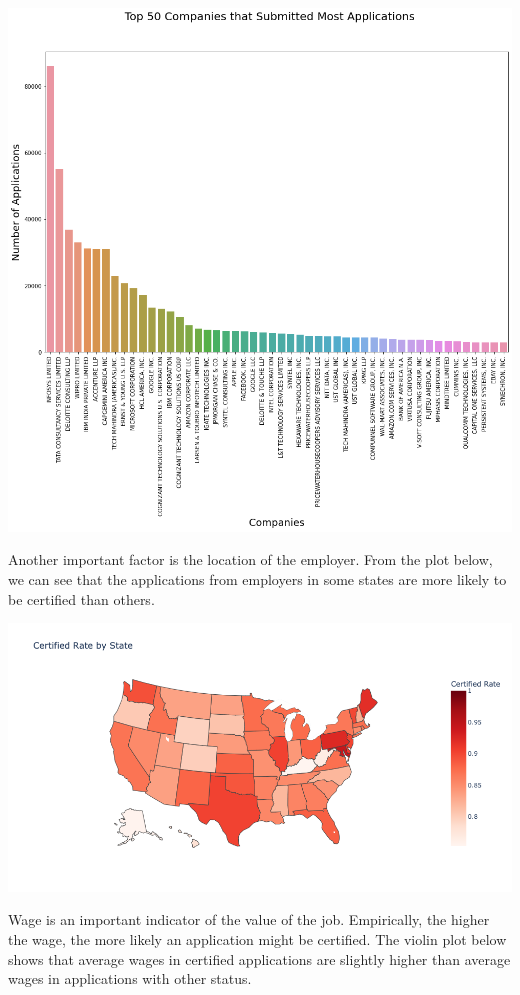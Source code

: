 \documentclass{article}
\begin{document}
\begin{multicols}{2}
\includegraphics[scale=0.24]{figures/fig7.png}

Another important factor is the location of the employer. From the plot below, we can see that the applications from employers in some states are more likely to be certified than others.



\includegraphics[scale=0.24]{figures/fig3.png}

Wage is an important indicator of the value of the job. Empirically, the higher the wage, the more likely an application might be certified. The violin plot below shows that average wages in certified applications are slightly higher than average wages in applications with other status.


\end{multicols}
\end{document}
